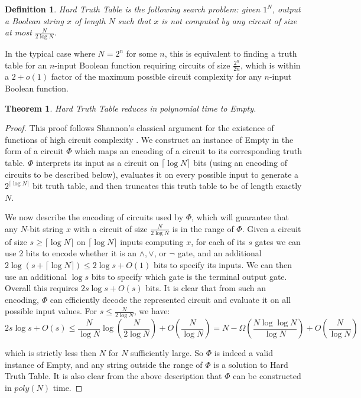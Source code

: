 \documentclass[11pt]{article}
\newtheorem{theorem}{Theorem}
\newtheorem{definition}{Definition}
\newcommand{\varbound}{\frac{2^n}{2n}}
\newcommand{\ttbound}{\frac{N}{2\log N}}
\begin{document}
\begin{definition}
{\sc Hard Truth Table} is the following search problem: given $1^N$, output a Boolean string $x$ of length $N$ such that $x$ is not computed by any circuit of size at most $\ttbound$.
\end{definition}
In the typical case where $N = 2^n$ for some $n$, this is equivalent to finding a truth table for an $n$-input Boolean function requiring circuits of size $\varbound$, which is within a $2 + o(1)$ factor of the maximum possible circuit complexity for any $n$-input Boolean function.

\begin{theorem}\label{thm:truth-tables-in-apepp}
{\sc Hard Truth Table} reduces in polynomial time to {\sc Empty}.
\end{theorem}
\begin{proof}
This proof follows Shannon's classical argument for the existence of functions of high circuit complexity \cite{Shannon}. We construct an instance of {\sc Empty} in the form of a circuit $\Phi$ which maps an encoding of a circuit to its corresponding truth table. $\Phi$ interprets its input as a circuit on $\lceil \log N \rceil$ bits (using an encoding of circuits to be described below), evaluates it on every possible input to generate a $2^{\lceil \log N \rceil}$ bit truth table, and then truncates this truth table to be of length exactly $N$.

We now describe the encoding of circuits used by $\Phi$, which will guarantee that any $N$-bit string $x$ with a circuit of size $\frac{N}{2\log N}$ is in the range of $\Phi$. Given a circuit of size $s \geq \lceil \log N \rceil $ on $\lceil \log N \rceil$ inputs computing $x$, for each of its $s$ gates we can use 2 bits to encode whether it is an $\land, \lor$, or $\lnot$ gate, and an additional $2\log (s+\lceil \log N \rceil) \leq 2\log s + O(1)$ bits to specify its inputs. We can then use an additional $\log s$ bits to specify which gate is the terminal output gate. Overall this requires $2s\log s + O(s)$ bits. It is clear that from such an encoding, $\Phi$ can efficiently decode the represented circuit and evaluate it on all possible input values. For $s \leq \frac{N}{2\log N}$, we have:
\[
2s\log s + O(s) \leq \frac{N}{\log N}\log\left(\frac{N}{2\log N}\right) + O\left(\frac{N}{\log N}\right) = N - \Omega\left(\frac{N\log\log N}{\log N}\right) + O\left(\frac{N}{\log N}\right)
\]

which is strictly less then $N$ for $N$ sufficiently large. So $\Phi$ is indeed a valid instance of {\sc Empty}, and any string outside the range of $\Phi$ is a solution to {\sc Hard Truth Table}. It is also clear from the above description that $\Phi$ can be constructed in $poly(N)$ time.


\end{proof}
\end{document}
